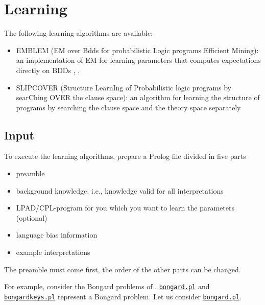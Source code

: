 \section{Learning}
\label{learning}
The following learning algorithms are available:
\begin{itemize}
\item EMBLEM (EM over Bdds for probabilistic Logic programs Efficient Mining): an implementation of EM for learning parameters that computes expectations directly on BDDs \cite{BelRig11-IDA}, \cite{BelRig11-CILC11-NC}, \cite{BelRig11-TR}
\item SLIPCOVER (Structure LearnIng of Probabilistic logic programs by searChing OVER the clause space): an algorithm for learning the structure of programs by searching the clause space and the theory space separately \cite{BelRig13-TPLP-IJ}
\end{itemize}

\subsection{Input}
To execute the learning algorithms, prepare a Prolog file divided in five parts
\begin{itemize}
\item preamble
\item  background knowledge, i.e., knowledge valid for all interpretations
\item  LPAD/CPL-program for you which you want to learn the parameters (optional)
\item language bias information
\item  example interpretations 
\end{itemize}
The preamble must come first, the order of the other parts can be changed.

For example, consider the Bongard problems of \cite{RaeLae95-ALT95}. 
\href{http://cplint.lamping.unife.it/example/bongard.pl}{\texttt{bongard.pl}} and \href{http://cplint.lamping.unife.it/example/bongardkeys.pl}{\texttt{bongardkeys.pl}} represent a Bongard problem.
Let us consider \href{http://cplint.lamping.unife.it/example/bongard.pl}{\texttt{bongard.pl}}.

